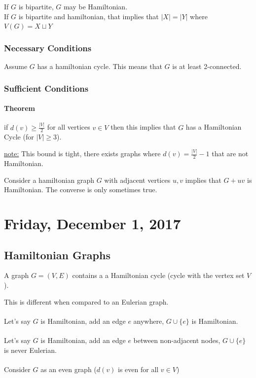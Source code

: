 \documentclass[12pt]{article}
\begin{document}
If $G$ is bipartite, $G$ may be Hamiltonian.\\
If $G$ is bipartite and hamiltonian, that implies that $|X|=|Y|$ where $V(G) = X \sqcup Y$

\subsubsection{Necessary Conditions}

Assume $G$ has a hamiltonian cycle. This means that $G$ is at least 2-connected.

\subsubsection{Sufficient Conditions}

\paragraph{Theorem} if $d(v) \geq \frac{|V|}{2}$ for all vertices $v\in V$ then this implies that $G$ has a Hamiltonian Cycle (for $|V| \geq 3$).

\begin{tcolorbox}
	\underline{note:} This bound is tight, there exists graphs where $d(v) = \frac{|V|}{2} -1$ that are not Hamiltonian.
\end{tcolorbox}

Consider a hamiltonian graph $G$ with adjacent vertices $u,v$ implies that $G + uv$ is Hamiltonian. The converse is only sometimes true.

\newpage

\section{Friday, December 1, 2017}

\subsection{Hamiltonian Graphs}

\begin{tcolorbox}[title=Definition: Hamiltonian Graphs]
	A graph $G = (V,E)$ contains a a Hamiltonian cycle (cycle with the vertex set $V$).
\end{tcolorbox}

This is different when compared to an Eulerian graph.\\ 
\\
Let's say $G$ is Hamiltonian, add an edge $e$ anywhere, $G \cup \{ e \}$ is Hamiltonian.\\
\\
Let's say $G$ is Hamiltonian, add an edge $e$ between non-adjacent nodes, $G \cup \{ e \}$ is never Eulerian.\\
\\
Consider $G$ as an even graph ($d(v)$ is even for all $v\in V$)
\end{document}
